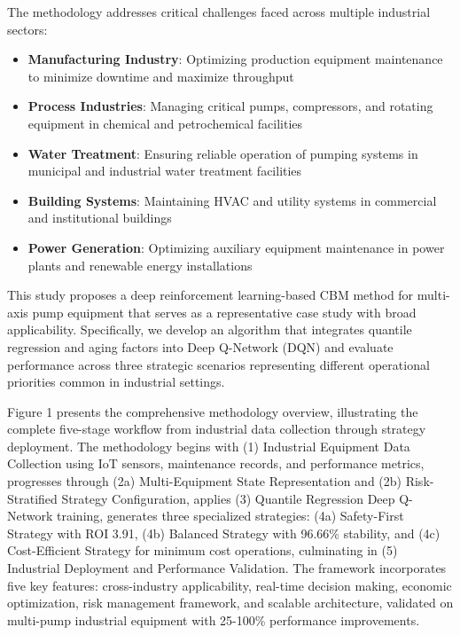 \documentclass[twocolumn]{article}
\begin{document}
The methodology addresses critical challenges faced across multiple industrial sectors:

\begin{itemize}
\item \textbf{Manufacturing Industry}: Optimizing production equipment maintenance to minimize downtime and maximize throughput
\item \textbf{Process Industries}: Managing critical pumps, compressors, and rotating equipment in chemical and petrochemical facilities
\item \textbf{Water Treatment}: Ensuring reliable operation of pumping systems in municipal and industrial water treatment facilities
\item \textbf{Building Systems}: Maintaining HVAC and utility systems in commercial and institutional buildings
\item \textbf{Power Generation}: Optimizing auxiliary equipment maintenance in power plants and renewable energy installations
\end{itemize}

This study proposes a deep reinforcement learning-based CBM method for multi-axis pump equipment that serves as a representative case study with broad applicability. Specifically, we develop an algorithm that integrates quantile regression and aging factors into Deep Q-Network (DQN) and evaluate performance across three strategic scenarios representing different operational priorities common in industrial settings.

Figure 1 presents the comprehensive methodology overview, illustrating the complete five-stage workflow from industrial data collection through strategy deployment. The methodology begins with (1) Industrial Equipment Data Collection using IoT sensors, maintenance records, and performance metrics, progresses through (2a) Multi-Equipment State Representation and (2b) Risk-Stratified Strategy Configuration, applies (3) Quantile Regression Deep Q-Network training, generates three specialized strategies: (4a) Safety-First Strategy with ROI 3.91, (4b) Balanced Strategy with 96.66\% stability, and (4c) Cost-Efficient Strategy for minimum cost operations, culminating in (5) Industrial Deployment and Performance Validation. The framework incorporates five key features: cross-industry applicability, real-time decision making, economic optimization, risk management framework, and scalable architecture, validated on multi-pump industrial equipment with 25-100\% performance improvements.
\end{document}
